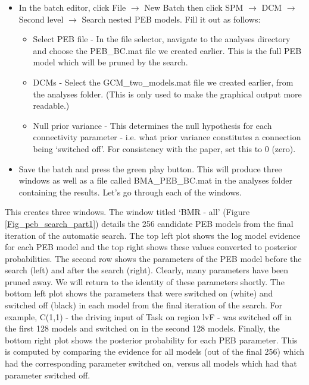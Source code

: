 \documentclass{article}
\begin{document}
\begin{itemize}
    \item In the batch editor, click File $\rightarrow$ New Batch then click SPM $\rightarrow$ DCM $\rightarrow$ Second level $\rightarrow$ Search nested PEB models. Fill it out as follows:
    \begin{itemize}
        \item Select PEB file - In the file selector, navigate to the analyses directory and choose the PEB\_BC.mat file we created earlier. This is the full PEB model which will be pruned by the search.
        \item DCMs - Select the GCM\_two\_models.mat file we created earlier, from the analyses folder. (This is only used to make the graphical output more readable.)
        \item Null prior variance - This determines the null hypothesis for each connectivity parameter - i.e. what prior variance constitutes a connection being `switched off'. For consistency with the paper, set this to 0 (zero).
    \end{itemize}
    \item Save the batch and press the green play button. This will produce three windows as well as a file called BMA\_PEB\_BC.mat in the analyses folder containing the results. Let's go through each of the windows.
\end{itemize}

This creates three windows. The window titled `BMR - all' (Figure \ref{Fig_peb_search_part1}) details the 256 candidate PEB models from the final iteration of the automatic search. The top left plot shows the log model evidence for each PEB model and the top right shows these values converted to posterior probabilities. The second row shows the parameters of the PEB model before the search (left) and after the search (right). Clearly, many parameters have been pruned away. We will return to the identity of these parameters shortly. The bottom left plot shows the parameters that were switched on (white) and switched off (black) in each model from the final iteration of the search. For example, C(1,1) - the driving input of Task on region lvF - was switched off in the first 128 models and switched on in the second 128 models. Finally, the bottom right plot shows the posterior probability for each PEB parameter. This is computed by comparing the evidence for all models (out of the final 256) which had the corresponding parameter switched on, versus all models which had that parameter switched off.
\end{document}
